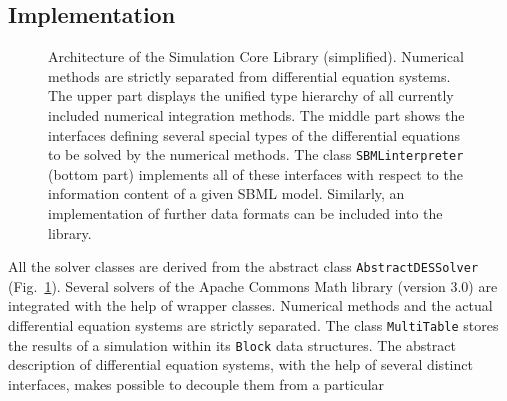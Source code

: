 \documentclass{bioinfo}
\newcommand{\AbstractDESSolver}{\texttt{Abstract\-DES\-Solver}}
\newcommand{\SBMLinterpreter}{\texttt{SBML\-interpreter}}
\newcommand{\MultiTable}{\texttt{Multi\-Table}}
\newcommand{\Block}{\texttt{Block}}
\begin{document}
\begin{methods}
\section{Implementation}
\begin{figure}
\caption[Architecture of the Simulation Core Library]{Architecture of
the Simulation Core Library (simplified). Numerical methods are
strictly separated from differential equation systems. The upper part displays
the unified type hierarchy of all currently included numerical integration
methods. The middle part shows the interfaces defining several
special types of the differential equations to be solved by the numerical
methods.
The class \SBMLinterpreter{} (bottom part) implements all of these interfaces
with respect to the information content of a given SBML model. Similarly, an
implementation of further data formats can be included into the
library.}%
\label{fig:Architecture}
\end{figure}
All the solver classes are derived from the abstract class \AbstractDESSolver{}
(Fig.~\ref{fig:Architecture}).
Several solvers of the Apache Commons Math library (version 3.0) are integrated
with the help of wrapper classes. Numerical methods and the actual differential
equation systems are strictly separated. The class \MultiTable{} stores the
results of a simulation within its \Block{} data structures. 
%
The abstract description of differential equation systems, with the help of
several distinct interfaces, makes possible to decouple them from a particular

\end{methods}
\end{document}
